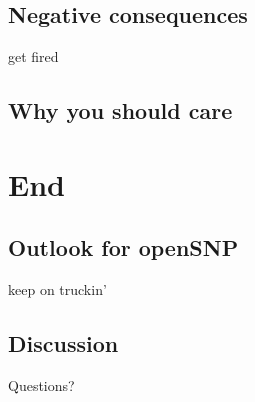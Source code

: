 \documentclass[12pt,a4paper]{beamer}
\begin{document}
\subsection{Negative consequences}
\begin{frame}
get fired
\end{frame}
\subsection{Why you should care}

\section{End}
\subsection{Outlook for openSNP}
\begin{frame}
keep on truckin'
\end{frame}

\subsection{Discussion}
\begin{frame}
Questions?
\end{frame}
\end{document}
